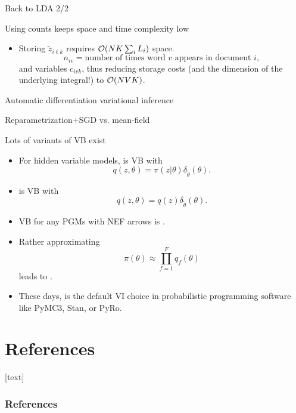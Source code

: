 \documentclass[10pt]{beamer}
\begin{document}
\begin{frame}{Back to LDA 2/2}

\end{frame}


\begin{frame}{Using counts keeps space and time complexity low}
\begin{itemize}
  \item Storing $\tilde z_{i\ell k}$ requires $\mathcal{O} (N K\sum_i L_i )$ space. 
  $$
  n_{iv} = \text{number of times word $v$ appears in document $i$},
  $$
  and variables $c_{ivk}$, thus reducing storage costs (and the dimension of the underlying integral!) to $\mathcal{O}(NVK)$.
\blank
\end{itemize}
\end{frame}

\begin{frame}{Automatic differentiation variational inference  \citep{KTRGB17}}
\vfill
\blank
\end{frame}

\begin{frame}{Reparametrization+SGD vs. mean-field}
  \vfill
  \blank
\end{frame}
  


\begin{frame}{Lots of variants of VB exist \citep{Mur12}}
  \begin{itemize}
    \item For hidden variable models,  is VB with $$q(z,\theta) = \pi(z\vert \theta)\delta_{\tilde\theta}(\theta).$$
    \item {} is VB with $$q(z,\theta) = q(z)\delta_{\tilde\theta}(\theta).$$
    \item VB for any PGMs with NEF arrows is .
    \item Rather approximating $$\pi(\theta) \approx \prod_{f=1}^F q_f(\theta)$$ leads to .
    \item These days,  is the default VI choice in probabilistic programming software like PyMC3, Stan, or PyRo.
  \end{itemize}
\end{frame}

\section*{References}
[text]%
\begin{frame}[allowframebreaks]
\frametitle{References}
\small
\printbibliography
\normalsize
\end{frame}
\end{document}
